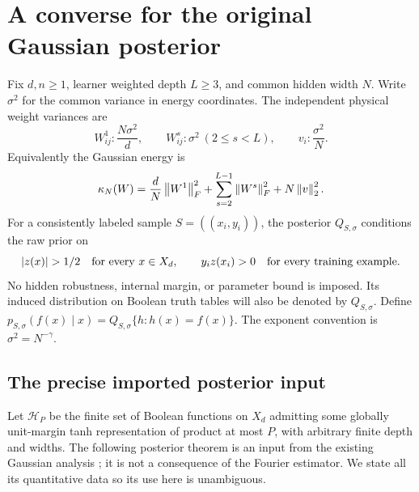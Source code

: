 \section{A converse for the original Gaussian posterior}
\label{sec:posterior}

Fix $d,n\ge1$, learner weighted depth $L\ge3$, and common hidden
width $N$. Write $\sigma^2$ for the common variance in energy
coordinates. The independent physical weight variances are
\[
 W^1_{ij}:\frac{N\sigma^2}{d},\qquad
 W^s_{ij}:\sigma^2\ (2\le s<L),\qquad
 v_i:\frac{\sigma^2}{N}.
\]
Equivalently the Gaussian energy is
\[
 \kappa_N(W)=\frac dN\left\lVert W^1\right\rVert_F^2+
       \sum_{s=2}^{L-1}\left\lVert W^s\right\rVert_F^2+N\left\lVert v\right\rVert_2^2.
\]
For a consistently labeled sample $S=((x_i,y_i))$, the posterior
$Q_{S,\sigma}$ conditions the raw prior on
\[
 |z(x)|>1/2\quad\hbox{for every }x\in X_d,
 \qquad y_i z(x_i)>0\quad\hbox{for every training example}.
\]
No hidden robustness, internal margin, or parameter bound is imposed.
Its induced distribution on Boolean truth tables will also be denoted
by $Q_{S,\sigma}$. Define
$p_{S,\sigma}(f(x)\mid x)=Q_{S,\sigma}\{h:h(x)=f(x)\}$.
The exponent convention is $\sigma^2=N^{-\gamma}$.

\subsection{The precise imported posterior input}

Let $\mathcal H_P$ be the finite set of Boolean functions on $X_d$
admitting some globally unit-margin tanh representation of product at
most $P$, with arbitrary finite depth and widths. The following
posterior theorem is an input from the existing Gaussian analysis
\cite{unrestricted}; it is not a consequence of the Fourier estimator.
We state all its quantitative data so its use here is unambiguous.

